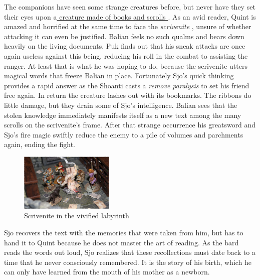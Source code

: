 The companions have seen some strange creatures before, but never have they set their eyes upon a\hyperref[fig:Scrivenite-in-the-vivified-labyrinth-563932189]{ creature made of books and scrolls } . As an avid reader, Quint is amazed and horrified at the same time to face the  {\itshape scrivenite} , unsure of whether attacking it can even be justified. Balian feels no such qualms and bears down heavily on the living documents. Puk finds out that his sneak attacks are once again useless against this being, reducing his roll in the combat to assisting the ranger. At least that is what he was hoping to do, because the scrivenite utters magical words that freeze Balian in place. Fortunately Sjo's quick thinking provides a rapid answer as the Shoanti casts a  {\itshape remove paralysis} to set his friend free again. In return the creature lashes out with its bookmarks. The ribbons do little damage, but they drain some of Sjo's intelligence. Balian sees that the stolen knowledge immediately manifests itself as a new text among the many scrolls on the scrivenite's frame. After that strange occurrence his greatsword and Sjo's fire magic swiftly reduce the enemy to a pile of volumes and parchments again, ending the fight. \\

\begin{figure}[h]
	\centering
	\includegraphics[width=0.4\textwidth]{images/Scrivenite-in-the-vivified-labyrinth-563932189_mod.jpg}
	\caption{Scrivenite in the vivified labyrinth}
	\label{fig:Scrivenite-in-the-vivified-labyrinth-563932189}
\end{figure}

Sjo recovers the text with the memories that were taken from him, but has to hand it to Quint because he does not master the art of reading. As the bard reads the words out loud, Sjo realizes that these recollections must date back to a time that he never consciously remembered. It is the story of his birth, which he can only have learned from the mouth of his mother as a newborn.\\

